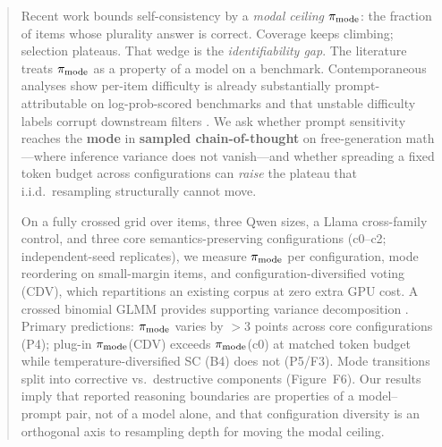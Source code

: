 \author{
  Anonymous Author(s) \\
  Affiliation \\
  \texttt{email@domain}
}

\date{}


\maketitle

\begin{abstract}
Recent work bounds self-consistency by a \emph{modal ceiling} $\pmode$: the
fraction of items whose plurality answer is correct. Coverage keeps climbing;
selection plateaus. That wedge is the \emph{identifiability gap}. The
literature treats $\pmode$ as a property of a model on a benchmark.
Contemporaneous analyses show per-item difficulty is already substantially
prompt-attributable on log-prob-scored benchmarks
\citep{brittlebench2026,tee2026} and that unstable difficulty labels corrupt
downstream filters \citep{hardunreached2026}. We ask whether prompt sensitivity
reaches the \textbf{mode} in \textbf{sampled chain-of-thought} on
free-generation math---where inference variance does not vanish---and whether
spreading a fixed token budget across configurations can \emph{raise} the
plateau that i.i.d.\ resampling structurally cannot move.

On a fully crossed grid over items, three Qwen sizes, a Llama cross-family
control, and three core semantics-preserving configurations (c0--c2;
independent-seed replicates), we measure $\pmode$ per configuration, mode
reordering on small-margin items, and configuration-diversified voting (CDV),
which repartitions an existing corpus at zero extra GPU cost. A crossed
binomial GLMM provides supporting variance decomposition
\citep{tee2026,prompteval2024}. Primary predictions: $\pmode$ varies by ${>}3$
points across core configurations (P4); plug-in $\pmode$(CDV) exceeds
$\pmode$(c0) at matched token budget while temperature-diversified SC (B4)
does not (P5/F3). Mode transitions split into corrective vs.\ destructive
components (Figure~F6).
Our results imply that reported reasoning boundaries are properties of a
model--prompt pair, not of a model alone, and that configuration diversity is
an orthogonal axis to resampling depth for moving the modal ceiling.
\end{abstract}


